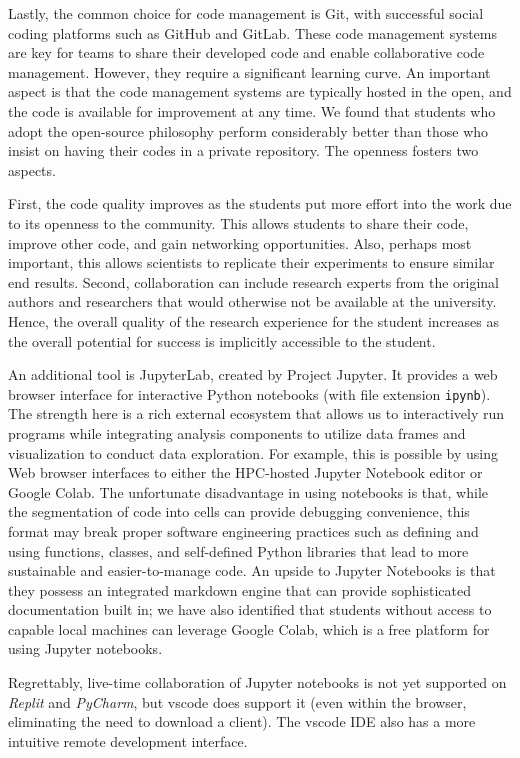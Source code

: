 \documentclass[utf8]{FrontiersinVancouver} %
\begin{document}
Lastly, the common choice for code management is Git, with successful social coding platforms such as GitHub and GitLab. These code management systems are key for teams to share their developed code and enable collaborative code management.  However, they require a significant learning curve. An important aspect is that the code management systems are typically hosted in the open, and the code is available for improvement at any time. We found that students who adopt the open-source philosophy perform considerably better than those who insist on having their codes in a private repository. The openness fosters two aspects. 

First, the code quality improves as the students put more effort into the work due to its openness to the community. This allows students to share their code, improve other code, and gain networking opportunities. Also, perhaps most important, this allows scientists to replicate their experiments to ensure similar end results. Second, collaboration can include research experts from the original authors and researchers that would otherwise not be available at the university. Hence, the overall quality of the research experience for the student increases as the overall potential for success is implicitly accessible to the student.

An additional tool is JupyterLab, created by Project Jupyter. It provides a web browser interface for interactive Python notebooks (with file extension \verb|ipynb|). The strength here is a rich external ecosystem that allows us to interactively run programs while integrating analysis components to utilize data frames and visualization to conduct data exploration. For example, this is possible by using Web browser interfaces to either the HPC-hosted Jupyter Notebook editor or Google Colab. The unfortunate disadvantage in using notebooks is that, while the segmentation of code into cells can provide debugging convenience, this format may break proper software engineering practices such as defining and using functions, classes, and self-defined Python libraries that lead to more sustainable and easier-to-manage code. An upside to Jupyter Notebooks is that they possess an integrated markdown engine that can provide sophisticated documentation built in; we have also identified that students without access to capable local machines can leverage Google Colab, which is a free platform for using Jupyter notebooks.

Regrettably, live-time collaboration of Jupyter notebooks is not yet supported on {\em Replit} and {\em PyCharm}, but vscode does support it (even within the browser, eliminating the need to download a client). The vscode IDE also has a more intuitive remote development interface.
\end{document}
